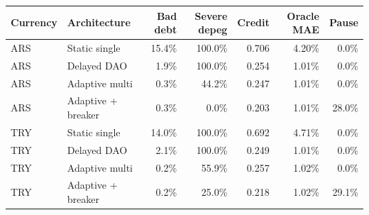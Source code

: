 \begin{tabular}{llrrrrr}
\toprule
Currency & Architecture & Bad debt & Severe depeg & Credit & Oracle MAE & Pause \\
\midrule
ARS & Static single & 15.4\% & 100.0\% & 0.706 & 4.20\% & 0.0\% \\
ARS & Delayed DAO & 1.9\% & 100.0\% & 0.254 & 1.01\% & 0.0\% \\
ARS & Adaptive multi & 0.3\% & 44.2\% & 0.247 & 1.01\% & 0.0\% \\
ARS & Adaptive + breaker & 0.3\% & 0.0\% & 0.203 & 1.01\% & 28.0\% \\
TRY & Static single & 14.0\% & 100.0\% & 0.692 & 4.71\% & 0.0\% \\
TRY & Delayed DAO & 2.1\% & 100.0\% & 0.249 & 1.01\% & 0.0\% \\
TRY & Adaptive multi & 0.2\% & 55.9\% & 0.257 & 1.02\% & 0.0\% \\
TRY & Adaptive + breaker & 0.2\% & 25.0\% & 0.218 & 1.02\% & 29.1\% \\
\bottomrule
\end{tabular}
